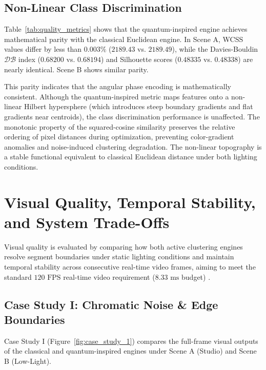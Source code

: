 \subsection{Non-Linear Class Discrimination}
Table~\ref{tab:quality_metrics} shows that the quantum-inspired engine achieves mathematical parity with the classical Euclidean engine. In Scene A, WCSS values differ by less than $0.003\%$ ($2189.43$ vs. $2189.49$), while the Davies-Bouldin $\mathcal{D}\mathcal{B}$ index ($0.68200$ vs. $0.68194$) and Silhouette scores ($0.48335$ vs. $0.48338$) are nearly identical. Scene B shows similar parity.

This parity indicates that the angular phase encoding is mathematically consistent. Although the quantum-inspired metric maps features onto a non-linear Hilbert hypersphere (which introduces steep boundary gradients and flat gradients near centroids), the class discrimination performance is unaffected. The monotonic property of the squared-cosine similarity preserves the relative ordering of pixel distances during optimization, preventing color-gradient anomalies and noise-induced clustering degradation. The non-linear topography is a stable functional equivalent to classical Euclidean distance under both lighting conditions.

\section{Visual Quality, Temporal Stability, and System Trade-Offs}
Visual quality is evaluated by comparing how both active clustering engines resolve segment boundaries under static lighting conditions and maintain temporal stability across consecutive real-time video frames, aiming to meet the standard $120\text{ FPS}$ real-time video requirement ($8.33\text{ ms}$ budget) \cite{jerald2009scene}.

\subsection{Case Study I: Chromatic Noise \& Edge Boundaries}\label{subsect:case_study_1}
Case Study I (Figure~\ref{fig:case_study_1}) compares the full-frame visual outputs of the classical and quantum-inspired engines under Scene A (Studio) and Scene B (Low-Light).

